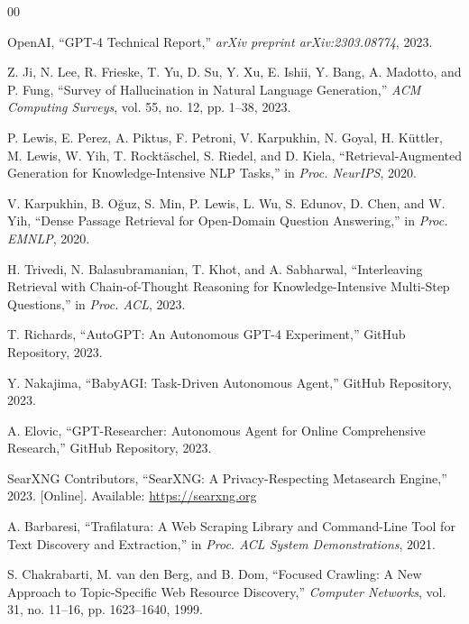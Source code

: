 \documentclass[conference]{IEEEtran}
\begin{document}
\begin{thebibliography}{00}

OpenAI, ``GPT-4 Technical Report,'' \textit{arXiv preprint arXiv:2303.08774}, 2023.

Z. Ji, N. Lee, R. Frieske, T. Yu, D. Su, Y. Xu, E. Ishii, Y. Bang, A. Madotto, and P. Fung, ``Survey of Hallucination in Natural Language Generation,'' \textit{ACM Computing Surveys}, vol. 55, no. 12, pp. 1--38, 2023.

P. Lewis, E. Perez, A. Piktus, F. Petroni, V. Karpukhin, N. Goyal, H. K{\"u}ttler, M. Lewis, W. Yih, T. Rockt{\"a}schel, S. Riedel, and D. Kiela, ``Retrieval-Augmented Generation for Knowledge-Intensive NLP Tasks,'' in \textit{Proc. NeurIPS}, 2020.

V. Karpukhin, B. O{\u{g}}uz, S. Min, P. Lewis, L. Wu, S. Edunov, D. Chen, and W. Yih, ``Dense Passage Retrieval for Open-Domain Question Answering,'' in \textit{Proc. EMNLP}, 2020.

H. Trivedi, N. Balasubramanian, T. Khot, and A. Sabharwal, ``Interleaving Retrieval with Chain-of-Thought Reasoning for Knowledge-Intensive Multi-Step Questions,'' in \textit{Proc. ACL}, 2023.

T. Richards, ``AutoGPT: An Autonomous GPT-4 Experiment,'' GitHub Repository, 2023.

Y. Nakajima, ``BabyAGI: Task-Driven Autonomous Agent,'' GitHub Repository, 2023.

A. Elovic, ``GPT-Researcher: Autonomous Agent for Online Comprehensive Research,'' GitHub Repository, 2023.

SearXNG Contributors, ``SearXNG: A Privacy-Respecting Metasearch Engine,'' 2023. [Online]. Available: \url{https://searxng.org}

A. Barbaresi, ``Trafilatura: A Web Scraping Library and Command-Line Tool for Text Discovery and Extraction,'' in \textit{Proc. ACL System Demonstrations}, 2021.

S. Chakrabarti, M. van den Berg, and B. Dom, ``Focused Crawling: A New Approach to Topic-Specific Web Resource Discovery,'' \textit{Computer Networks}, vol. 31, no. 11--16, pp. 1623--1640, 1999.

\end{thebibliography}
\end{document}
